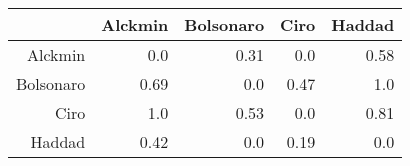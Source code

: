 \begin{table}[H]
  \centering
  \begin{tabular}{rrrrr}
    \hline
     & Alckmin & Bolsonaro & Ciro & Haddad \\
    \hline
    Alckmin & 0.0 & 0.31 & 0.0 & 0.58 \\
    Bolsonaro & 0.69 & 0.0 & 0.47 & 1.0 \\
    Ciro & 1.0 & 0.53 & 0.0 & 0.81 \\
    Haddad & 0.42 & 0.0 & 0.19 & 0.0 \\\hline\hline
  \end{tabular}
  \label{tbl:ctn}
\end{table}
